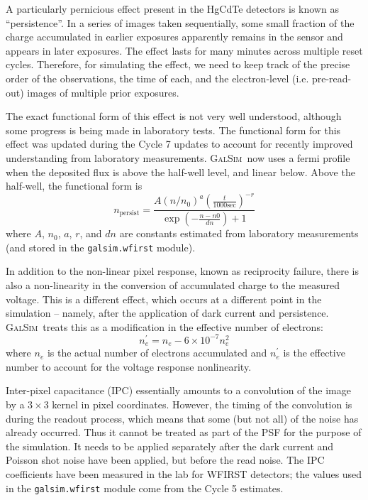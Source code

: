 \documentclass[aps,prd, amsmath,amssymb,superscriptaddress,showkeys,nofootinbib,reprint,preprintnumbers]{revtex4-1}
\newcommand{\galsim}{\textsc{GalSim}}
\begin{document}
A particularly pernicious effect present in the HgCdTe detectors is known as ``persistence''.  
In a series of images taken sequentially, some small fraction of the charge accumulated in earlier exposures apparently remains in the sensor and appears in later exposures.  
The effect lasts for many minutes across multiple reset cycles.  
Therefore, for simulating the effect, we need to keep track of the precise order of the observations, the time of each, and the electron-level (i.e. pre-read-out) images of multiple prior exposures.

The exact functional form of this effect is not very well understood, although some progress is being made in laboratory tests.  
The functional form for this effect was updated during the Cycle 7 updates to account for recently improved understanding from laboratory measurements.
\galsim\ now uses a fermi profile when the deposited flux is above the half-well level, and linear below.
Above the half-well, the functional form is
\begin{equation}
n_\mathrm{persist} = \frac{A \left(n/n_0\right)^a  \left(\frac{t}{1000 \mathrm{sec}}\right)^{-r}}
{ \exp(- \frac{n-n0}{dn})+ 1}
\end{equation}
where $A$, $n_0$, $a$, $r$, and $dn$ are constants estimated from laboratory measurements (and stored in the \texttt{galsim.wfirst} module).

In addition to the non-linear pixel response, known as reciprocity failure, there is also a non-linearity in the conversion of accumulated charge to the measured voltage.
This is a different effect, which occurs at a different point in the simulation -- namely, after the application of dark current and persistence. 
\galsim\ treats this as a modification in the effective number of electrons:
\begin{equation}
n_e^\prime = n_e - 6 \times 10^{-7} n_e^2
\end{equation}
where $n_e$ is the actual number of electrons accumulated and $n_e^\prime$ is the effective number to account for the voltage response nonlinearity.

Inter-pixel capacitance (IPC) essentially amounts to a convolution of the image by a $3 \times 3$ kernel in pixel coordinates.
However, the timing of the convolution is during the readout process, which means that some (but not all) of the noise has already occurred.  
Thus it cannot be treated as part of the PSF for the purpose of the simulation.  
It needs to be applied separately after the dark current and Poisson shot noise have been applied, but before the read noise.  
The IPC coefficients have been measured in the lab for WFIRST detectors; the values used in the \texttt{galsim.wfirst} module come from the Cycle 5 estimates.
\end{document}
